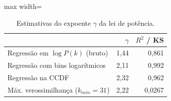 \begin{table}[t]
\centering
\small
\caption{Estimativas do expoente $\gamma$ da lei de potência.}
\label{tab:potencia}
\begin{adjustbox}{max width=\linewidth}
\begin{tabular}{lrr}
\toprule
 & $\gamma$ & $R^2$ / KS \\
\midrule
Regressão em $\log P(k)$ (bruto) & 1,44 & 0,861 \\
Regressão com bins logarítmicos & 2,11 & 0,992 \\
Regressão na CCDF & 2,32 & 0,962 \\
Máx. verossimilhança ($k_{min}=31$) & 2,22 & 0,0267 \\
\bottomrule
\end{tabular}
\end{adjustbox}
\end{table}
